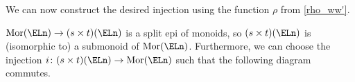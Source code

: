 We can now construct the desired injection using the function $\rho$ from \cref{rho_ww'}.
\begin{prop}\label{stGnsub} $\mathrm{Mor}(\ELn) \rightarrow (s \times t)(\ELn)$ is a split epi of monoids, so $(s \times t)(\ELn)$ is (isomorphic to) a submonoid of $\mathrm{Mor}(\ELn)$. Furthermore, we can choose the injection $i \colon (s \times t)(\ELn) \rightarrow \mathrm{Mor}(\ELn)$ such that the following diagram commutes.
\begin{center}
\end{center}		
\end{prop}
